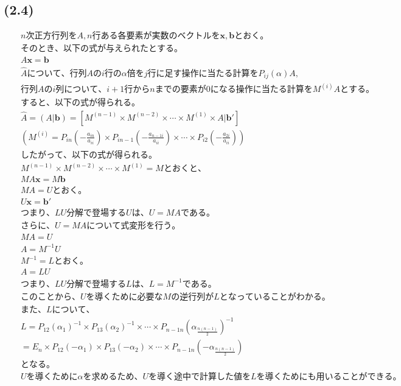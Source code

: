 \documentclass[uplatex, dvipdfmx, a4j,11pt]{jsarticle}
\begin{document}
\subsection*{(2.4)}
\begin{eqnarray*}
  &&n次正方行列をA, n行ある各要素が実数のベクトルを\boldsymbol{x}, \boldsymbol{b}とおく。\\
  &&そのとき、以下の式が与えられたとする。\\
  &&A\boldsymbol{x} = \boldsymbol{b}\\
  &&\hat{A} について、行列Aのi行の \alpha 倍をj行に足す操作に当たる計算をP_{ij}(\alpha)A,\\
  &&行列Aのi列について、i+1行からnまでの要素が0になる操作に当たる計算をM^{(i)}Aとする。\\
  &&すると、以下の式が得られる。\\
  &&\hat{A} = (A | \boldsymbol{b}) = [M^{(n-1)} \times M^{(n-2)} \times \cdots \times M^{(1)} \times A | \boldsymbol{b'}]\\
  &&\left(M^{(i)} = P_{in}\left( -\frac{a_{i n}}{a_{i i}} \right) \times P_{i n-1}\left( -\frac{a_{n-1 i}}{a_{i i}} \right) \times \cdots \times P_{i 2}\left( -\frac{a_{2 i}}{a_{i i}} \right)\right)\\
  &&したがって、以下の式が得られる。\\
  &&M^{(n-1)} \times M^{(n-2)} \times \cdots \times M^{(1)} = Mとおくと、\\
  &&MA\boldsymbol{x} = M\boldsymbol{b}\\
  &&MA=Uとおく。\\
  &&U\boldsymbol{x} = \boldsymbol{b'}\\
  &&つまり、LU分解で登場するUは、U=MAである。\\
  &&さらに、U=MAについて式変形を行う。\\
  &&MA=U\\
  &&A=M^{-1}U\\
  &&M^{-1}=Lとおく。\\
  &&A=LU\\
  &&つまり、LU分解で登場するLは、L=M^{-1}である。\\
  &&このことから、Uを導くために必要なMの逆行列がLとなっていることがわかる。\\
  &&また、Lについて、\\
  &&L = P_{12}(\alpha_{1})^{-1} \times P_{13}(\alpha_{2})^{-1} \times \cdots \times P_{n-1 n}(\alpha_{\frac{n(n-1)}{2}})^{-1}\\
  &&= E_{n} \times P_{12}(-\alpha_{1}) \times P_{13}(-\alpha_{2}) \times \cdots \times P_{n-1 n}(-\alpha_{\frac{n(n-1)}{2}})\\
  &&となる。\\
  &&Uを導くために \alpha を求めるため、Uを導く途中で計算した値をLを導くためにも用いることができる。\\
\end{eqnarray*}
\end{document}
